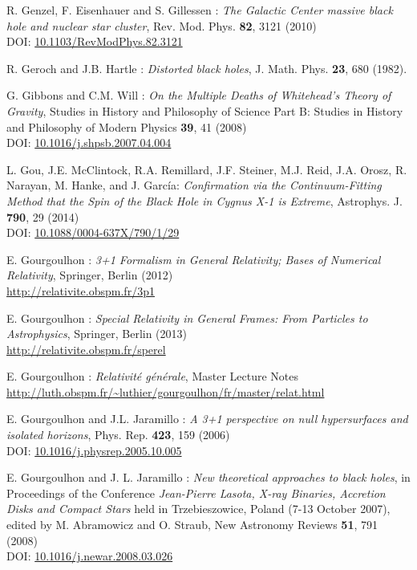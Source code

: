 \begin{thebibliography}{123}
R. Genzel, F. Eisenhauer and S. Gillessen :
{\em The Galactic Center massive black hole and nuclear star cluster},
Rev. Mod. Phys. {\bf 82}, 3121 (2010)\\
DOI: \href{https://doi.org/10.1103/RevModPhys.82.3121}{10.1103/RevModPhys.82.3121}

R. Geroch and J.B. Hartle : {\em Distorted black holes},
J. Math. Phys. {\bf 23}, 680 (1982).

G. Gibbons and C.M. Will : {\em On the Multiple Deaths of Whitehead's Theory of Gravity},
Studies in History and Philosophy of Science Part B: Studies in History and Philosophy of Modern Physics {\bf 39}, 41 (2008)\\
DOI: \href{https://doi.org/10.1016/j.shpsb.2007.04.004}{10.1016/j.shpsb.2007.04.004}

L. Gou, J.E. McClintock, R.A. Remillard, J.F. Steiner, M.J. Reid, J.A. Orosz, R. Narayan, M. Hanke, and J. García:
{\em Confirmation via the Continuum-Fitting Method that the Spin of the Black Hole in Cygnus X-1 is Extreme},
Astrophys. J. {\bf 790}, 29 (2014)\\
DOI: \href{https://doi.org/10.1088/0004-637X/790/1/29}{10.1088/0004-637X/790/1/29}

E. Gourgoulhon : {\em 3+1 Formalism in General Relativity; Bases of Numerical Relativity},
Springer, Berlin (2012)\\
\url{http://relativite.obspm.fr/3p1}

E. Gourgoulhon : {\em Special Relativity in General Frames: From Particles to Astrophysics},
Springer, Berlin (2013) \\
\url{http://relativite.obspm.fr/sperel}

E. Gourgoulhon : {\em Relativit\'e g\'en\'erale},
Master Lecture Notes\\
\url{http://luth.obspm.fr/~luthier/gourgoulhon/fr/master/relat.html}

E. Gourgoulhon and J.L. Jaramillo : {\em A 3+1 perspective on null hypersurfaces and isolated horizons},
Phys. Rep. {\bf 423}, 159 (2006)\\
DOI: \href{https://doi.org/10.1016/j.physrep.2005.10.005}{10.1016/j.physrep.2005.10.005}

E. Gourgoulhon and J. L. Jaramillo : {\em New theoretical approaches to black holes},
in Proceedings of the Conference {\em Jean-Pierre Lasota, X-ray Binaries, Accretion Disks and Compact Stars} held in Trzebieszowice, Poland (7-13 October 2007), edited by M. Abramowicz and O. Straub, New Astronomy Reviews {\bf 51}, 791 (2008) \\
DOI: \href{https://doi.org/10.1016/j.newar.2008.03.026}{10.1016/j.newar.2008.03.026}


\end{thebibliography}
